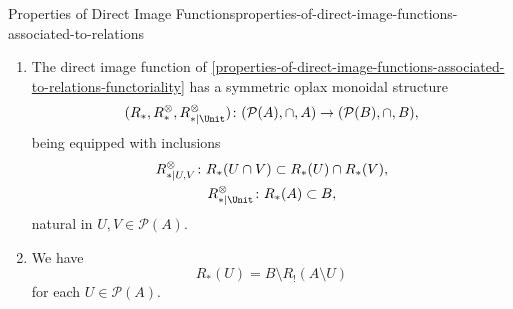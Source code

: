 \begin{proposition}{Properties of Direct Image Functions}{properties-of-direct-image-functions-associated-to-relations}
\begin{enumerate}
\[\begin{gathered}
                    R^{\otimes}_{*|U,V}   \colon R_{*}(U)\cup R_{*}(V) \rightequalsarrow R_{*}(U\cup V),\\
                    R^{\otimes}_{*|\Unit} \colon \emptyset             \rightequalsarrow \emptyset,
                \end{gathered}
            \]%
            natural in $U,V\in\mathcal{P}(A)$.
        \item\label{properties-of-direct-image-functions-associated-to-relations-symmetric-oplax-monoidality-with-respect-to-intersections}The direct image function of \cref{properties-of-direct-image-functions-associated-to-relations-functoriality} has a symmetric oplax monoidal structure
            \[
                (R_{*},R^{\otimes}_{*},R^{\otimes}_{*|\Unit})
                \colon
                (\mathcal{P}(A),\cap,A)
                \to
                (\mathcal{P}(B),\cap,B),
            \]%
            being equipped with inclusions%
            \[
                \begin{gathered}
                    R^{\otimes}_{*|U,V}   \colon R_{*}(U\cap V) \subset R_{*}(U)\cap R_{*}(V),\\
                    R^{\otimes}_{*|\Unit} \colon R_{*}(A)       \subset B,
                \end{gathered}
            \]%
            natural in $U,V\in\mathcal{P}(A)$.
        \item\label{properties-of-direct-image-functions-associated-to-relations-relation-to-direct-images-with-compact-support}We have
            \[
                R_{*}(U)%
                =%
                B\setminus R_{!}(A\setminus U)%
            \]%
            for each $U\in\mathcal{P}(A)$.
    \end{enumerate}
\end{proposition}
